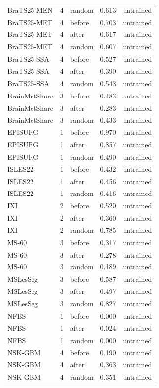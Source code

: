 \begin{tabular}{lrlrl}
BraTS25-MEN & 4 & random & 0.613 & untrained \\
BraTS25-MET & 4 & before & 0.703 & untrained \\
BraTS25-MET & 4 & after & 0.617 & untrained \\
BraTS25-MET & 4 & random & 0.607 & untrained \\
BraTS25-SSA & 4 & before & 0.527 & untrained \\
BraTS25-SSA & 4 & after & 0.390 & untrained \\
BraTS25-SSA & 4 & random & 0.543 & untrained \\
BrainMetShare & 3 & before & 0.483 & untrained \\
BrainMetShare & 3 & after & 0.283 & untrained \\
BrainMetShare & 3 & random & 0.433 & untrained \\
EPISURG & 1 & before & 0.970 & untrained \\
EPISURG & 1 & after & 0.857 & untrained \\
EPISURG & 1 & random & 0.490 & untrained \\
ISLES22 & 1 & before & 0.432 & untrained \\
ISLES22 & 1 & after & 0.456 & untrained \\
ISLES22 & 1 & random & 0.416 & untrained \\
IXI & 2 & before & 0.520 & untrained \\
IXI & 2 & after & 0.360 & untrained \\
IXI & 2 & random & 0.785 & untrained \\
MS-60 & 3 & before & 0.317 & untrained \\
MS-60 & 3 & after & 0.278 & untrained \\
MS-60 & 3 & random & 0.189 & untrained \\
MSLesSeg & 3 & before & 0.587 & untrained \\
MSLesSeg & 3 & after & 0.497 & untrained \\
MSLesSeg & 3 & random & 0.827 & untrained \\
NFBS & 1 & before & 0.000 & untrained \\
NFBS & 1 & after & 0.024 & untrained \\
NFBS & 1 & random & 0.000 & untrained \\
NSK-GBM & 4 & before & 0.190 & untrained \\
NSK-GBM & 4 & after & 0.363 & untrained \\
NSK-GBM & 4 & random & 0.351 & untrained \\

\end{tabular}
